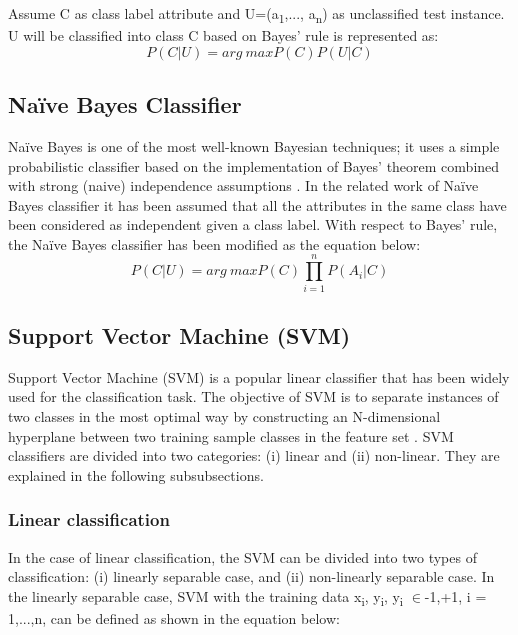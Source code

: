 \documentclass[review]{elsarticle}
\begin{document}
Assume C as class label attribute and U=(a\textsubscript{1},..., a\textsubscript{n}) as unclassified test instance. U will be classified into class C based on Bayes’ rule is represented as:
 	\begin{equation}
 	P(C|U)=arg\ max P(C)P(U|C)
 	\label{eq:BN}
 	\end{equation}
 	
\subsection{Na\"ive Bayes Classifier}
\label{subsec:Naive}
Na\"ive Bayes is one of the most well-known Bayesian techniques; it uses a simple probabilistic classifier based on the implementation of Bayes' theorem combined with strong (naive) independence assumptions \cite{Lowd2005}. In the related work of Na\"ive Bayes classifier it has been assumed that all the attributes in the same class have been considered as independent given a class label. With respect to Bayes’ rule, the Na\"ive Bayes classifier has been modified as the equation below:
 	\begin{equation}
 	P(C|U) = arg\ max P(C) \prod_{i=1}^n P(A_i|C)
 	\label{eq:Naive}
 	\end{equation}
 	
\subsection{Support Vector Machine (SVM)}
\label{subsec:SVM}
Support Vector Machine (SVM) is a popular linear classifier that has been widely used for the classification task. The objective of SVM is to separate instances of two classes in the most optimal way by constructing an N-dimensional hyperplane between two training sample classes in the feature set \cite{Cortes1995}. SVM classifiers are divided into two categories: (i) linear and (ii) non-linear. They are explained in the following subsubsections. \\

 		\subsubsection{Linear classification}
 		In the case of linear classification, the SVM can be divided into two types of classification: (i) linearly separable case, and (ii) non-linearly separable case. 
 		In the linearly separable case, SVM with the training data {x\textsubscript{i}, y\textsubscript{i}}, y\textsubscript{i} $\in${-1,+1}, i = 1,...,n, can be defined as shown in the equation below: 
		
\end{document}
